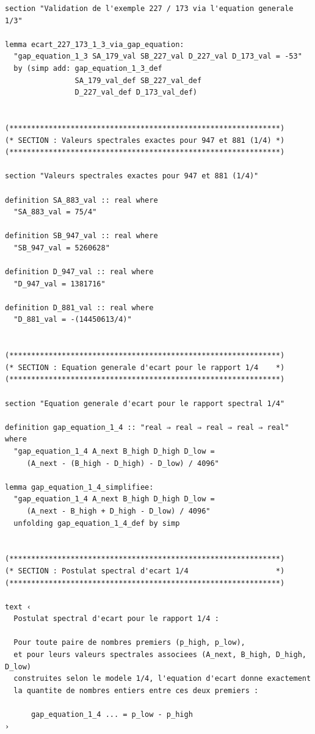 \documentclass[a4paper,11pt]{article}
\begin{document}
\begin{holcode}[title={\textcolor{white}{File: methode\_spectral.thy -- Part 1/4}}]
\begin{lstlisting}
section "Validation de l'exemple 227 / 173 via l'equation generale 1/3"

lemma ecart_227_173_1_3_via_gap_equation:
  "gap_equation_1_3 SA_179_val SB_227_val D_227_val D_173_val = -53"
  by (simp add: gap_equation_1_3_def
                SA_179_val_def SB_227_val_def
                D_227_val_def D_173_val_def)


(**************************************************************)
(* SECTION : Valeurs spectrales exactes pour 947 et 881 (1/4) *)
(**************************************************************)

section "Valeurs spectrales exactes pour 947 et 881 (1/4)"

definition SA_883_val :: real where
  "SA_883_val = 75/4"

definition SB_947_val :: real where
  "SB_947_val = 5260628"

definition D_947_val :: real where
  "D_947_val = 1381716"

definition D_881_val :: real where
  "D_881_val = -(14450613/4)"


(**************************************************************)
(* SECTION : Equation generale d'ecart pour le rapport 1/4    *)
(**************************************************************)

section "Equation generale d'ecart pour le rapport spectral 1/4"

definition gap_equation_1_4 :: "real ⇒ real ⇒ real ⇒ real ⇒ real" where
  "gap_equation_1_4 A_next B_high D_high D_low =
     (A_next - (B_high - D_high) - D_low) / 4096"

lemma gap_equation_1_4_simplifiee:
  "gap_equation_1_4 A_next B_high D_high D_low =
     (A_next - B_high + D_high - D_low) / 4096"
  unfolding gap_equation_1_4_def by simp


(**************************************************************)
(* SECTION : Postulat spectral d'ecart 1/4                    *)
(**************************************************************)

text ‹
  Postulat spectral d'ecart pour le rapport 1/4 :

  Pour toute paire de nombres premiers (p_high, p_low),
  et pour leurs valeurs spectrales associees (A_next, B_high, D_high, D_low)
  construites selon le modele 1/4, l'equation d'ecart donne exactement
  la quantite de nombres entiers entre ces deux premiers :

      gap_equation_1_4 ... = p_low - p_high
›


\end{lstlisting}
\end{holcode}
\end{document}
